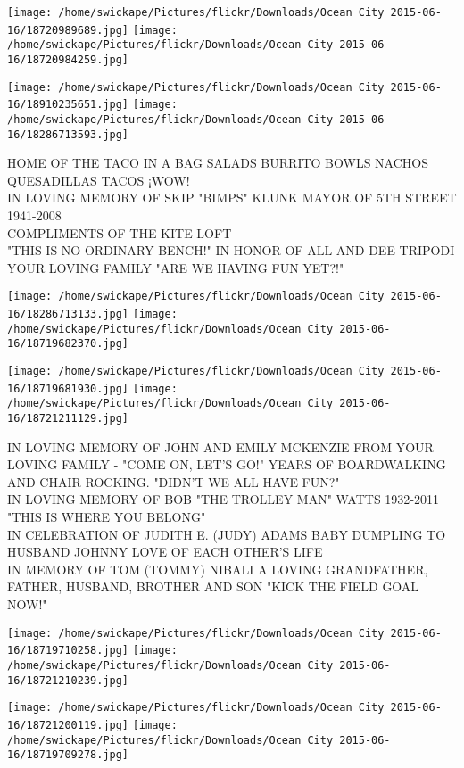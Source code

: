 \documentclass[10pt,letterpaper]{article}
\begin{document}
\texttt{[image: /home/swickape/Pictures/flickr/Downloads/Ocean City 2015-06-16/18720989689.jpg]}
\texttt{[image: /home/swickape/Pictures/flickr/Downloads/Ocean City 2015-06-16/18720984259.jpg]}

\texttt{[image: /home/swickape/Pictures/flickr/Downloads/Ocean City 2015-06-16/18910235651.jpg]}
\texttt{[image: /home/swickape/Pictures/flickr/Downloads/Ocean City 2015-06-16/18286713593.jpg]}

HOME OF THE TACO IN A BAG SALADS BURRITO BOWLS NACHOS QUESADILLAS TACOS ¡WOW!\\
IN LOVING MEMORY OF SKIP "BIMPS" KLUNK MAYOR OF 5TH STREET 1941{-}2008\\
COMPLIMENTS OF THE KITE LOFT\\
"THIS IS NO ORDINARY BENCH!" IN HONOR OF ALL AND DEE TRIPODI YOUR LOVING FAMILY "ARE WE HAVING FUN YET?!"
\pagebreak

\texttt{[image: /home/swickape/Pictures/flickr/Downloads/Ocean City 2015-06-16/18286713133.jpg]}
\texttt{[image: /home/swickape/Pictures/flickr/Downloads/Ocean City 2015-06-16/18719682370.jpg]}

\texttt{[image: /home/swickape/Pictures/flickr/Downloads/Ocean City 2015-06-16/18719681930.jpg]}
\texttt{[image: /home/swickape/Pictures/flickr/Downloads/Ocean City 2015-06-16/18721211129.jpg]}

IN LOVING MEMORY OF JOHN AND EMILY MCKENZIE FROM YOUR LOVING FAMILY {-} "COME ON, LET'S GO!"  YEARS OF BOARDWALKING AND CHAIR ROCKING.  "DIDN'T WE ALL HAVE FUN?"\\
IN LOVING MEMORY OF BOB "THE TROLLEY MAN" WATTS 1932{-}2011 "THIS IS WHERE YOU BELONG"\\
IN CELEBRATION OF JUDITH E. (JUDY) ADAMS BABY DUMPLING TO HUSBAND JOHNNY LOVE OF EACH OTHER'S LIFE\\
IN MEMORY OF TOM (TOMMY) NIBALI A LOVING GRANDFATHER, FATHER, HUSBAND, BROTHER AND SON "KICK THE FIELD GOAL NOW!"
\pagebreak

\texttt{[image: /home/swickape/Pictures/flickr/Downloads/Ocean City 2015-06-16/18719710258.jpg]}
\texttt{[image: /home/swickape/Pictures/flickr/Downloads/Ocean City 2015-06-16/18721210239.jpg]}

\texttt{[image: /home/swickape/Pictures/flickr/Downloads/Ocean City 2015-06-16/18721200119.jpg]}
\texttt{[image: /home/swickape/Pictures/flickr/Downloads/Ocean City 2015-06-16/18719709278.jpg]}
\end{document}
